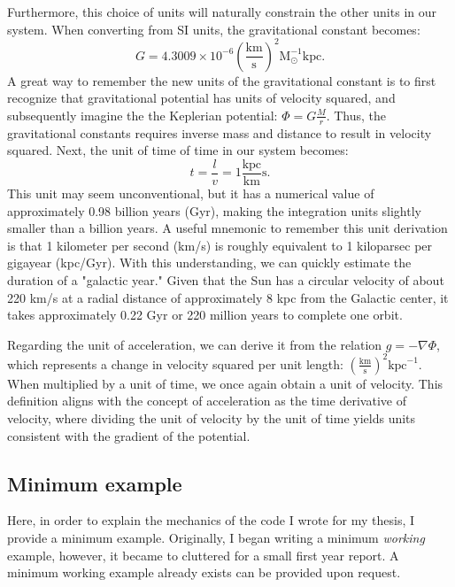 Furthermore, this choice of units will naturally constrain the other units in our system. When converting from SI units, the gravitational constant becomes:
\begin{equation*}
G = 4.3009 \times 10^{-6} \left(\frac{\mathrm{km}}{\mathrm{s}}\right)^2 \mathrm{M}_{\odot}^{-1} \mathrm{kpc}.
\end{equation*}
A great way to remember the new units of the gravitational constant is to first recognize that gravitational potential has units of velocity squared, and subsequently imagine the the Keplerian potential: $\Phi = G\frac{M}{r}$. Thus, the gravitational constants requires inverse mass and distance to result in velocity squared. Next, the unit of time of time in our system becomes:
\begin{equation}
    t = \frac{l}{v} = 1  \frac{\mathrm{kpc}}{\mathrm{km}}\mathrm{s}. 
\end{equation}
This unit may seem unconventional, but it has a numerical value of approximately 0.98 billion years (Gyr), making the integration units slightly smaller than a billion years. A useful mnemonic to remember this unit derivation is that 1 kilometer per second (km/s) is roughly equivalent to 1 kiloparsec per gigayear (kpc/Gyr). With this understanding, we can quickly estimate the duration of a "galactic year." Given that the Sun has a circular velocity of about 220 km/s at a radial distance of approximately 8 kpc from the Galactic center, it takes approximately 0.22 Gyr or 220 million years to complete one orbit.

Regarding the unit of acceleration, we can derive it from the relation $g = -\nabla \Phi$, which represents a change in velocity squared per unit length: $\left(\frac{\mathrm{km}}{\mathrm{s}}\right)^2 \mathrm{kpc}^{-1}$. When multiplied by a unit of time, we once again obtain a unit of velocity. This definition aligns with the concept of acceleration as the time derivative of velocity, where dividing the unit of velocity by the unit of time yields units consistent with the gradient of the potential.


\subsection{Minimum example}\label{sec:MinimumWorkingExample}
Here, in order to explain the mechanics of the code I wrote for my thesis, I provide a minimum example. Originally, I  began writing a minimum \textit{working} example, however, it became to cluttered for a small first year report. A minimum working example already exists can be provided upon request. 
